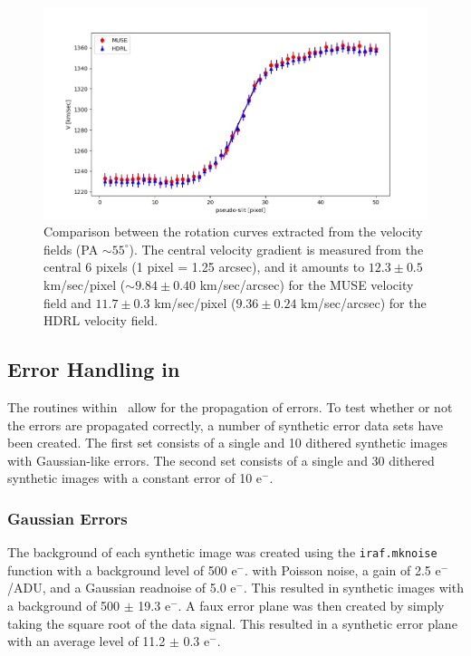 \begin{figure}[H]
\centering
\includegraphics[width=16cm]{figures/FCC184_rotation_velocity.jpeg}
\caption[] {\footnotesize Comparison between the rotation curves extracted from the
  velocity fields (PA $\sim 55^{\circ}$). The central velocity
  gradient is measured from the central 6 pixels (1 pixel = 1.25
  arcsec), and it amounts to $12.3 \pm 0.5$ km/sec/pixel
  ($\sim 9.84 \pm 0.40$ km/sec/arcsec) for the MUSE velocity field and
  $11.7 \pm 0.3$ km/sec/pixel ($9.36 \pm 0.24$ km/sec/arcsec) for the
  HDRL velocity field.}
\label{fig:FCC184_rotation_velocity}
\end{figure}


\subsection{Error Handling in \hdrlresample}
\label{sect:errors}

The routines within \hdrlresample\ allow for the propagation of errors.   To test whether or not the errors are propagated correctly,
a number of synthetic error data sets have been created.   The first set consists of a single and 10 dithered synthetic images with
Gaussian-like errors.   The second set consists of a single and 30 dithered synthetic images with a constant error of 10 e$^-$.

\subsubsection{Gaussian Errors}
The background of each synthetic image was created using the {\tt iraf.mknoise} function with a background level of 500 e$^-$.
with Poisson noise, a gain of 2.5 e$^{-}$/ADU, and a Gaussian readnoise of 5.0 e$^{-}$.   This resulted in synthetic images with a
background of 500 $\pm$ 19.3 e$^-$.   
A faux error plane was then created by simply taking the square root of the data signal.   This resulted in a synthetic error plane
with an average level of 11.2 $\pm$ 0.3 e$^-$.


